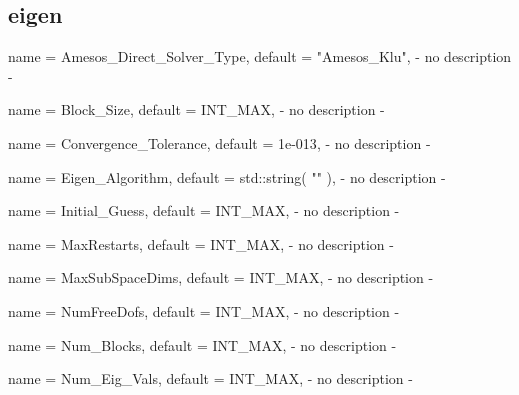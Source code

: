 \subsection{eigen}

\begin{parameter}{
    name    = {Amesos_Direct_Solver_Type},
    default = {"Amesos_Klu"},
}
- no description -
\end{parameter}

\begin{parameter}{
    name    = {Block_Size},
    default = {INT_MAX},
}
- no description -
\end{parameter}

\begin{parameter}{
    name    = {Convergence_Tolerance},
    default = {1e-013},
}
- no description -
\end{parameter}

\begin{parameter}{
    name    = {Eigen_Algorithm},
    default = {std::string( "" )},
}
- no description -
\end{parameter}

\begin{parameter}{
    name    = {Initial_Guess},
    default = {INT_MAX},
}
- no description -
\end{parameter}

\begin{parameter}{
    name    = {MaxRestarts},
    default = {INT_MAX},
}
- no description -
\end{parameter}

\begin{parameter}{
    name    = {MaxSubSpaceDims},
    default = {INT_MAX},
}
- no description -
\end{parameter}

\begin{parameter}{
    name    = {NumFreeDofs},
    default = {INT_MAX},
}
- no description -
\end{parameter}

\begin{parameter}{
    name    = {Num_Blocks},
    default = {INT_MAX},
}
- no description -
\end{parameter}

\begin{parameter}{
    name    = {Num_Eig_Vals},
    default = {INT_MAX},
}
- no description -
\end{parameter}

